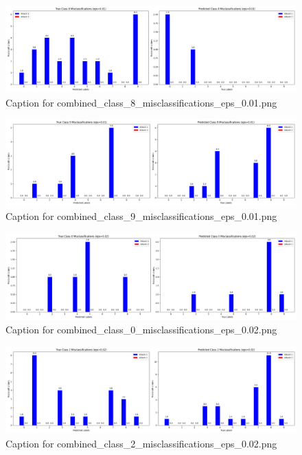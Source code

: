 \documentclass[11pt,onside]{article}
\begin{document}
\begin{figure}[ht]
\centering
\includegraphics[width=1\textwidth]{combined_class_boundary_pgd/combined_class_8_misclassifications_eps_0.01.png}
\caption{Caption for combined_class_8_misclassifications_eps_0.01.png}
\label{fig:combined_class_8_misclassifications_eps_0.01.png}
\end{figure}



\begin{figure}[ht]
\centering
\includegraphics[width=1\textwidth]{combined_class_boundary_pgd/combined_class_9_misclassifications_eps_0.01.png}
\caption{Caption for combined_class_9_misclassifications_eps_0.01.png}
\label{fig:combined_class_9_misclassifications_eps_0.01.png}
\end{figure}

\begin{figure}[ht]
\centering
\includegraphics[width=1\textwidth]{combined_class_boundary_pgd/combined_class_0_misclassifications_eps_0.02.png}
\caption{Caption for combined_class_0_misclassifications_eps_0.02.png}
\label{fig:combined_class_0_misclassifications_eps_0.02.png}
\end{figure}

\begin{figure}[ht]
\centering
\includegraphics[width=1\textwidth]{combined_class_boundary_pgd/combined_class_2_misclassifications_eps_0.02.png}
\caption{Caption for combined_class_2_misclassifications_eps_0.02.png}
\label{fig:combined_class_2_misclassifications_eps_0.02.png}
\end{figure}
\end{document}
